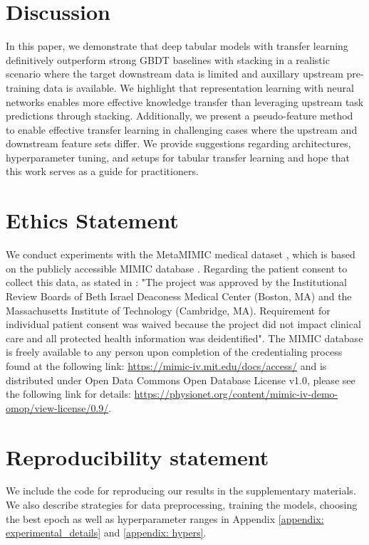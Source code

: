 \section{Discussion}
In this paper, we demonstrate that deep tabular models with transfer learning definitively outperform strong GBDT baselines with stacking in a realistic scenario where the target downstream data is limited and auxillary upstream pre-training data is available. We highlight that representation learning with neural networks enables more effective knowledge transfer than leveraging upstream task predictions through stacking. Additionally, we present a pseudo-feature method to enable effective transfer learning in challenging cases where the upstream and downstream feature sets differ. We provide suggestions regarding architectures, hyperparameter tuning, and setups for tabular transfer learning and hope that this work serves as a guide for practitioners. 

\section{Ethics Statement} We conduct experiments with the MetaMIMIC medical dataset \citep{metaMIMIC_github, woznica2022consolidated}, which is based on the publicly accessible MIMIC database \citep{goldberger2000physiobank, johnson2016mimic, mimiciv_v1}. Regarding the patient consent to collect this data, as stated in \citep{johnson2016mimic}: "The project was approved by the Institutional Review Boards of Beth Israel Deaconess Medical Center (Boston, MA) and the Massachusetts Institute of Technology (Cambridge, MA). Requirement for individual patient consent was waived because the project did not impact clinical care and all protected health information was deidentified". The MIMIC database is freely available to any person upon completion of the credentialing process found at the following link: \url{https://mimic-iv.mit.edu/docs/access/} and is distributed under Open Data Commons Open Database License v1.0, please see the following link for details: \url{https://physionet.org/content/mimic-iv-demo-omop/view-license/0.9/}. 

\section{Reproducibility statement}

We include the code for reproducing our results in the supplementary materials. We also describe strategies for data preprocessing, training the models, choosing the best epoch as well as hyperparameter ranges in Appendix \ref{appendix: experimental_details} and \ref{appendix: hypers}.


